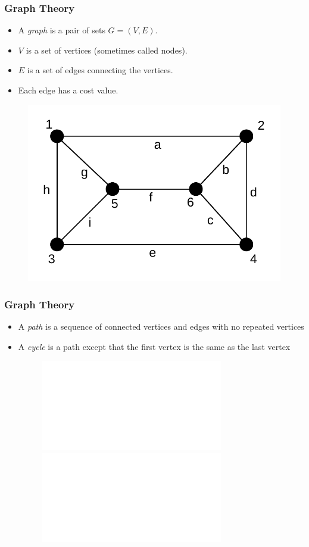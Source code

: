 \documentclass{beamer}
\begin{document}
\begin{frame}
\frametitle{Graph Theory}
\begin{itemize}
	\item A \textit{graph} is a pair of sets $G = (V,E)$.
	\item $V$ is a set of vertices (sometimes called nodes).
	\item $E$ is a set of edges connecting the vertices.
	\item Each edge has a cost value.

\end{itemize}

\begin{figure}
	\centering
	\includegraphics[scale=0.6]{graphExample.pdf}
\end{figure}

\end{frame}

\begin{frame}
\frametitle{Graph Theory}
\begin{itemize}
	\item<1> A \textit{path} is a sequence of connected vertices and edges with no repeated vertices
	\item<2> A \textit{cycle} is a path except that the first vertex is the same as the last vertex
	\begin{figure}
	\centering
	\includegraphics<1>[scale=0.6]{pathExample.pdf}
	\includegraphics<2>[scale=0.6]{cycleExample.pdf}
	\end{figure}
\end{itemize}
\end{frame}
\end{document}
